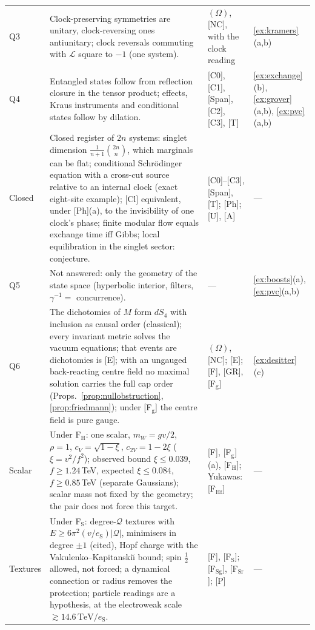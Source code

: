 \documentclass[aps,pra,onecolumn,superscriptaddress,nofootinbib,10pt]{revtex4-2}
\theoremstyle{definition}
\theoremstyle{remark}
\newcommand{\cL}{\mathcal{L}}
\begin{document}
\begin{table}[h]
\begin{tabular}{@{}p{}p{}p{}p{}@{}}
Q3 & Clock-preserving symmetries are unitary, clock-reversing ones antiunitary; clock reversals commuting with $\cL$ square to $-1$ (one system). & $(\Omega)$, [NC], with the clock reading & \ref{ex:kramers}(a,b)\\
Q4 & Entangled states follow from reflection closure in the tensor product; effects, Kraus instruments and conditional states follow by dilation. & [C0], [C1], [Span], [C2], [C3], [T] & \ref{ex:exchange}(b), \ref{ex:grover}(a,b), \ref{ex:pvc}(a,b)\\
Closed & Closed register of $2n$ systems: singlet dimension $\frac1{n+1}\binom{2n}{n}$, which marginals can be flat; conditional Schr\"odinger equation with a cross-cut source relative to an internal clock (exact eight-site example); [Cl] equivalent, under [Ph](a), to the invisibility of one clock's phase; finite modular flow equals exchange time iff Gibbs; local equilibration in the singlet sector: conjecture. & [C0]--[C3], [Span], [T]; [Ph]; [U], [A] & ---\\
Q5 & Not answered: only the geometry of the state space (hyperbolic interior, filters, $\gamma^{-1}=$ concurrence). & --- & \ref{ex:boosts}(a), \ref{ex:pvc}(a,b)\\
Q6 & The dichotomies of $M$ form $dS_4$ with inclusion as causal order (classical); every invariant metric solves the vacuum equations; that events are dichotomies is [E]; with an ungauged back-reacting centre field no maximal solution carries the full cap order (Props.~\ref{prop:nullobstruction}, \ref{prop:friedmann}); under [F$_{\mathrm g}$] the centre field is pure gauge. & $(\Omega)$, [NC]; [E]; [F], [GR], [F$_{\mathrm g}$] & \ref{ex:desitter}(c)\\
Scalar & Under F$_{\mathrm H}$: one scalar, $m_W=gv/2$, $\rho=1$, $c_V=\sqrt{1-\xi}$, $c_{2V}=1-2\xi$ ($\xi=v^2/f^2$); observed bound $\xi\le0.039$, $f\ge1.24$\,TeV, expected $\xi\le0.084$, $f\ge0.85$\,TeV (separate Gaussians); scalar mass not fixed by the geometry; the pair does not force this target. & [F], [F$_{\mathrm g}$](a), [F$_{\mathrm H}$]; Yukawas: [F$_{\mathrm{Hf}}$] & ---\\
Textures & Under F$_{\mathrm S}$: degree-$\mathcal Q$ textures with $E\ge6\pi^2(v/e_{\mathrm S})\lvert\mathcal Q\rvert$, minimisers in degree $\pm1$ (cited), Hopf charge with the Vakulenko--Kapitanski\u{\i} bound; spin $\tfrac12$ allowed, not forced; a dynamical connection or radius removes the protection; particle readings are a hypothesis, at the electroweak scale $\gtrsim14.6\,\mathrm{TeV}/e_{\mathrm S}$. & [F], [F$_{\mathrm S}$]; [F$_{\mathrm{Sg}}$], [F$_{\mathrm{Sr}}$]; [P] & ---\\

\end{tabular}
\end{table}
\end{document}

